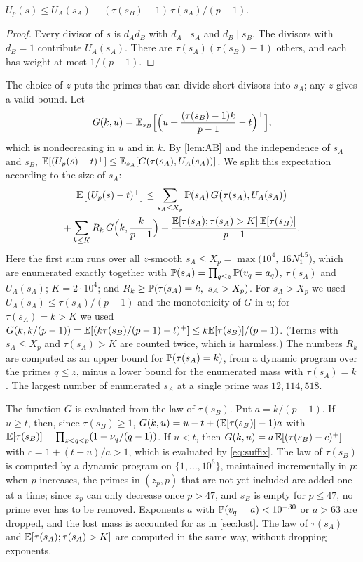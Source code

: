 \begin{lemma}\label{lem:AB}
$U_p(s)\le U_A(s_A)+(\tau(s_B)-1)\,\tau(s_A)/(p-1)$.
\end{lemma}

\begin{proof}
Every divisor of $s$ is $d_Ad_B$ with $d_A\mid s_A$ and $d_B\mid s_B$. The divisors with $d_B=1$ contribute
$U_A(s_A)$. There are $\tau(s_A)(\tau(s_B)-1)$ others, and each has weight at most $1/(p-1)$.
\end{proof}

The choice of $z$ puts the primes that can divide short divisors into $s_A$; any $z$ gives a valid bound. Let
\[
  G(k,u)=\E_{s_B}\Bigl[\Bigl(u+\frac{(\tau(s_B)-1)k}{p-1}-t\Bigr)^+\Bigr],
\]
which is nondecreasing in $u$ and in $k$. By \cref{lem:AB} and the independence of $s_A$ and $s_B$,
$\E[(U_p(s)-t)^+]\le\E_{s_A}[G(\tau(s_A),U_A(s_A))]$. We split this expectation according to the size of $s_A$:
\begin{multline}\label{eq:AB-bound}
  \E\bigl[(U_p(s)-t)^+\bigr]\le\sum_{s_A\le X_p}\P(s_A)\,G\bigl(\tau(s_A),U_A(s_A)\bigr)\\
  +\sum_{k\le K}R_k\,G\Bigl(k,\frac{k}{p-1}\Bigr)+\frac{\E[\tau(s_A);\tau(s_A)>K]\,\E[\tau(s_B)]}{p-1}.
\end{multline}
Here the first sum runs over all $z$-smooth $s_A\le X_p=\max\bigl(10^4,\,16N_1^{4.5}\bigr)$, which are
enumerated exactly together with $\P(s_A)=\prod_{q\le z}\P(v_q=a_q)$, $\tau(s_A)$ and $U_A(s_A)$; $K=2\cdot10^4$;
and $R_k\ge\P(\tau(s_A)=k,\ s_A>X_p)$. For $s_A>X_p$ we used $U_A(s_A)\le\tau(s_A)/(p-1)$ and the monotonicity of
$G$ in $u$; for $\tau(s_A)=k>K$ we used $G(k,k/(p-1))=\E[(k\tau(s_B)/(p-1)-t)^+]\le k\E[\tau(s_B)]/(p-1)$. (Terms
with $s_A\le X_p$ and $\tau(s_A)>K$ are counted twice, which is harmless.) The numbers $R_k$ are computed as an
upper bound for $\P(\tau(s_A)=k)$, from a dynamic program over the primes $q\le z$, minus a lower bound for the
enumerated mass with $\tau(s_A)=k$. The largest number of enumerated $s_A$ at a single prime was $12{,}114{,}518$.

The function $G$ is evaluated from the law of $\tau(s_B)$. Put $a=k/(p-1)$. If $u\ge t$, then, since $\tau(s_B)\ge1$,
$G(k,u)=u-t+(\E[\tau(s_B)]-1)a$ with $\E[\tau(s_B)]=\prod_{z<q<p}(1+\nu_q/(q-1))$. If $u<t$, then
$G(k,u)=a\,\E[(\tau(s_B)-c)^+]$ with $c=1+(t-u)/a>1$, which is evaluated by \eqref{eq:suffix}. The law of
$\tau(s_B)$ is computed by a dynamic program on $\{1,\dots,10^6\}$, maintained incrementally in $p$: when $p$
increases, the primes in $(z_p,p)$ that are not yet included are added one at a time; since $z_p$ can only decrease
once $p>47$, and $s_B$ is empty for $p\le47$, no prime ever has to be removed. Exponents $a$ with
$\P(v_q=a)<10^{-30}$ or $a>63$ are dropped, and the lost mass is accounted for as in \cref{sec:lost}. The law of
$\tau(s_A)$ and $\E[\tau(s_A);\tau(s_A)>K]$ are computed in the same way, without dropping exponents.

